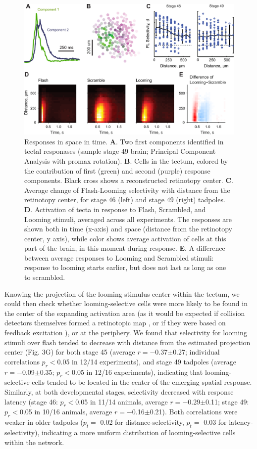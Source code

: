 \documentclass{article}
\begin{document}
\begin{figure}[t!]
\includegraphics[width=\linewidth]{fig3.pdf}
\caption{
Responses in space in time. \textbf{A}. Two first components identified in tectal responases (sample stage 49 brain; Principal Component Analysis with promax rotation).  \textbf{B}. Cells in the tectum, colored by the contribution of first (green) and second (purple) response components. Black cross shows a reconstructed retinotopy center. \textbf{C}. Average change of Flash-Looming selectivity with distance from the retinotopy center, for stage 46 (left) and stage 49 (right) tadpoles. \textbf{D}. Activation of tecta in response to Flash, Scrambled, and Looming stimuli, averaged across all experiments. The responses are shown both in time (x-axis) and space (distance from the retinotopy center, y axis), while color shows average activation of cells at this part of the brain, in this moment during response. \textbf{E}. A difference between average responses to Looming and Scrambled stimuli: response to looming starts earlier, but does not last as long as one to scrambled.}
\end{figure}

Knowing the projection of the looming stimulus center within the tectum, we could then check whether looming-selective cells were more likely to be found in the center of the expanding activation area (as it would be expected if collision detectors themselves formed a retinotopic map \citep{frost2004review}, or if they were based on feedback excitation \citep{jang2016}), or at the periphery. We found that selectivity for looming stimuli over flash tended to decrease with distance from the estimated projection center (Fig. 3G) for both stage 45 (average $r=-$0.37$\pm$0.27; individual correlations $p_r<$0.05 in 12/14 experiments), and stage 49 tadpoles (average $r=-$0.09$\pm$0.35; $p_r<$0.05 in 12/16 experiments), indicating that looming-selective cells tended to be located in the center of the emerging spatial response. Similarly, at both developmental stages, selectivity decreased with response latency (stage 46: $p_r<$0.05 in 11/14 animals, average $r=-$0.29$\pm$0.11; stage 49: $p_r<$0.05 in 10/16 animals, average $r=-$0.16$\pm$0.21). Both correlations were weaker in older tadpoles ($p_t=$ 0.02 for distance-selectivity, $p_t=$ 0.03 for latency-selectivity), indicating a more uniform distribution of looming-selective cells within the network.
\end{document}
